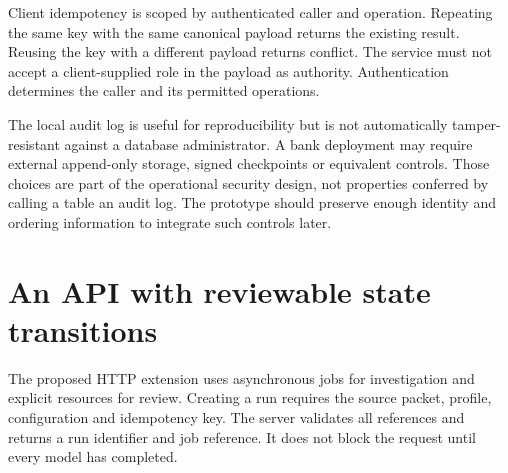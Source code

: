 \documentclass[12pt,a4paper,oneside,openany]{book}
\begin{document}
Client idempotency is scoped by authenticated caller and operation. Repeating the
same key with the same canonical payload returns the existing result. Reusing the
key with a different payload returns conflict. The service must not accept a
client-supplied role in the payload as authority. Authentication determines the
caller and its permitted operations.

The local audit log is useful for reproducibility but is not automatically
 tamper-resistant against a database administrator. A bank deployment may require
external append-only storage, signed checkpoints or equivalent controls. Those
choices are part of the operational security design, not properties conferred by
calling a table an audit log. The prototype should preserve enough identity and
ordering information to integrate such controls later.

\section{An API with reviewable state transitions}
\label{merge:M08:07}


The proposed HTTP extension uses asynchronous jobs for investigation and explicit
resources for review. Creating a run requires the source packet, profile,
configuration and idempotency key. The server validates all references and returns
a run identifier and job reference. It does not block the request until every
model has completed.
\end{document}

